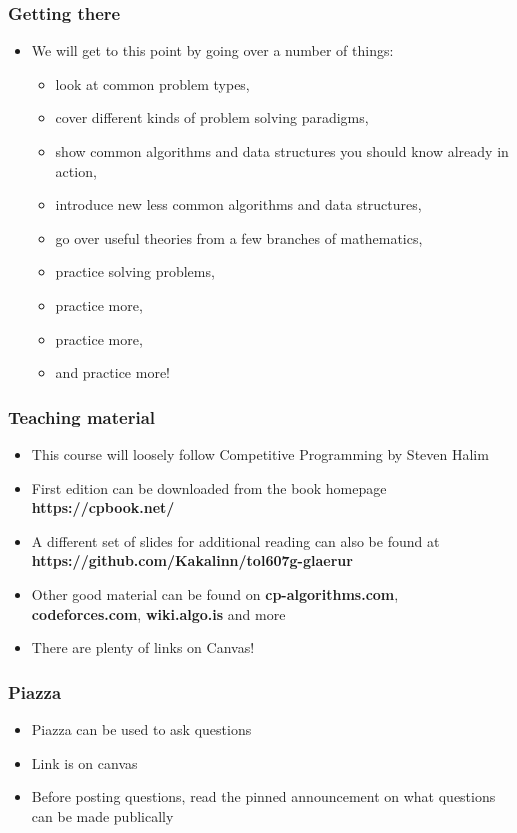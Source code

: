 \documentclass{beamer}
\begin{document}
\begin{frame}[plain]
	\frametitle{Getting there}
	\begin{itemize}
		 \item We will get to this point by going over a number of things:
		 \begin{itemize}
		 	\item look at common problem types,
		 	\item cover different kinds of problem solving paradigms,
		 	\item show common algorithms and data structures you should know already in action,
		 	\item introduce new less common algorithms and data structures,
		 	\item go over useful theories from a few branches of mathematics,
		 	\item practice solving problems,
		 	\item practice more,
		 	\item practice more,
		 	\item and practice more!
		 \end{itemize}
	\end{itemize}
\end{frame}

\begin{frame}[plain]
	\frametitle{Teaching material}
	\begin{itemize}
		 \item This course will loosely follow \alert{Competitive Programming} by Steven Halim
		 \item First edition can be downloaded from the book homepage \textbf{https://cpbook.net/}
		 \item A different set of slides for additional reading can also be found at \textbf{https://github.com/Kakalinn/tol607g-glaerur}
         \item Other good material can be found on \textbf{cp-algorithms.com}, \textbf{codeforces.com}, \textbf{wiki.algo.is} and more
         \item There are plenty of links on Canvas!
     \end{itemize}
\end{frame}

\begin{frame}[plain]
	\frametitle{Piazza}
	\begin{itemize}
		\item Piazza can be used to ask questions
        \item Link is on canvas
        \item Before posting questions, read the pinned announcement on what questions can be made publically
	\end{itemize}
\end{frame}
\end{document}
